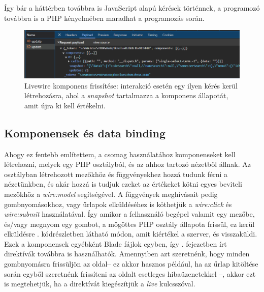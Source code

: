 \documentclass[
]{thesis-ekf}
\theoremstyle{definition}
\theoremstyle{remark}
\begin{document}
Így bár a háttérben továbbra is JavaScript alapú kérések történnek, a programozó továbbra is a PHP kényelmében maradhat a programozás során.

\begin{figure}[ht!]
	\centering
	\includegraphics[width=15cm]{../pictures/screenshots/livewire_update.png}
	\caption{Livewire komponens frissítése: interakció esetén egy ilyen kérés kerül létrehozásra, ahol a \emph{snapshot} tartalmazza a komponens állapotát, amit újra ki kell értékelni.}
	\label{livewireUpdate}
\end{figure}

\subsection{Komponensek és data binding}

Ahogy ez fentebb említettem, a csomag használatához komponenseket kell létrehozni, melyek egy PHP osztályból, és az ahhoz tartozó nézetből állnak. Az osztályban létrehozott mezőkhöz és függvényekhez hozzá tudunk férni a nézetünkben, és akár hozzá is tudjuk ezeket az értékeket kötni egyes beviteli mezőkhöz a \emph{wire:model} segítségével. A függvények meghívásait pedig gombnyomásokhoz, vagy űrlapok elküldéséhez is köthetjük a \emph{wire:click} és \emph{wire:submit} használatával. Így amikor a felhasználó begépel valamit egy mezőbe, és/vagy megnyom egy gombot, a mögöttes PHP osztály állapota frissül, ez kerül elküldésre . kódrészletben látható módon, amit kiértékel a szerver, és visszaküldi. Ezek a komponensek egyébként Blade fájlok egyben, így . fejezetben írt direktívák továbbra is használhatók. Amennyiben azt szeretnénk, hogy minden  gombnyomásra frissüljön az oldal-- ez akkor hasznos például, ha az űrlap kitöltése során egyből szeretnénk frissíteni az oldalt esetleges hibaüzenetekkel --, akkor ezt is megtehetjük, ha a direktívát kiegészítjük a \emph{live} kulcsszóval.


\end{document}
